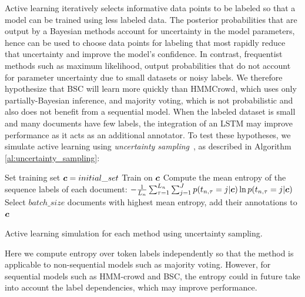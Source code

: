 Active learning iteratively selects informative data points to be labeled so that a model can be trained
using less labeled data. The posterior probabilities that are output by a Bayesian methods 
account for uncertainty in the model parameters, hence can be used to choose data points for labeling 
that most rapidly reduce that uncertainty and improve the model's confidence. In contrast, frequentist methods
such as maximum likelihood, output probabilities that do not account for parameter uncertainty due to 
small datasets or noisy labels. 
We therefore hypothesize that BSC will learn more quickly than HMMCrowd, which uses only partially-Bayesian
inference, and majority voting, which is not probabilistic and also does not benefit from a sequential model.
When the labeled dataset is small and many documents have few labels, the integration of an LSTM
may improve performance as it acts as an additional annotator.
To test these hypotheses, we simulate active learning using \emph{uncertainty sampling}~\cite{settles2010active},
as described in Algorithm \ref{al:uncertainty_sampling}:
\begin{algorithm}
\DontPrintSemicolon
 \nl Set training set $\boldsymbol c=initial\_set$ \;
 {
 \nl Train on $\boldsymbol c$\;
 \nl Compute the mean entropy of the sequence labels of each document: 
 $-\frac{1}{L_n} \sum_{\tau=1}^{L_n}
 \sum_{j=1}^J
 p(t_{n,\tau} = j | \boldsymbol c) \ln p(t_{n,\tau} = j | \boldsymbol c) $
 \;
 \nl Select $batch\_size$ documents with highest mean entropy, add their annotations to $\boldsymbol c$\;
 }
\caption{Active learning simulation for each method using uncertainty sampling.}
\label{al:uncertainty_sampling}
\end{algorithm}
Here we compute entropy over token labels independently so that 
the method is applicable to non-sequential models such as majority voting. 
However, for sequential models such as HMM-crowd and BSC, the entropy 
could in future take into account the label dependencies, which may improve performance.

